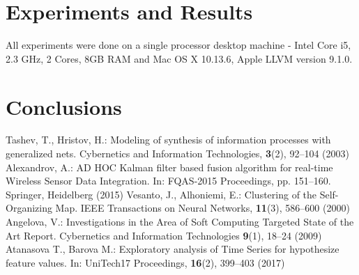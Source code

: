 \documentclass[runningheads]{llncs}
\begin{document}
\cite{vesanto01}

\section{Experiments and Results}

All experiments were done on a single processor desktop machine - Intel Core i5, 2.3 GHz, 2 Cores, 8GB RAM and Mac OS X 10.13.6, Apple LLVM version 9.1.0.

\section{Conclusions}

\begin{thebibliography}{8}
Tashev, T., Hristov, H.: Modeling of synthesis of information processes with generalized nets. Cybernetics and Information Technologies, \textbf{3}(2), 92--104 (2003) 
Alexandrov, A.: AD HOC Kalman filter based fusion algorithm for real-time Wireless Sensor Data Integration. In: FQAS-2015 Proceedings, pp. 151--160. Springer, Heidelberg (2015)
Vesanto, J., Alhoniemi, E.: Clustering of the Self-Organizing Map. IEEE Transactions on Neural Networks, \textbf{11}(3), 586--600 (2000) 
Angelova, V.: Investigations in the Area of Soft Computing Targeted State of the Art Report. Cybernetics and Information Technologies \textbf{9}(1), 18--24 (2009)
Atanasova T., Barova M.: Exploratory analysis of Time Series for hypothesize feature values. In: UniTech17 Proceedings,  \textbf{16}(2), 399--403 (2017)
\end{thebibliography}
\end{document}

